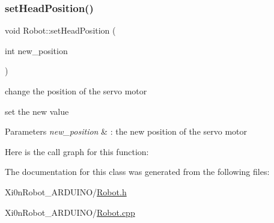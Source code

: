 \subsubsection{\texorpdfstring{set\+Head\+Position()}{setHeadPosition()}}
{\footnotesize\ttfamily void Robot\+::set\+Head\+Position (\begin{DoxyParamCaption}\item[{int}]{new\+\_\+position }\end{DoxyParamCaption})}



change the position of the servo motor 

set the new value


\begin{DoxyParams}{Parameters}
{\em new\+\_\+position} & \+: the new position of the servo motor \\
\hline
\end{DoxyParams}
Here is the call graph for this function\+:


The documentation for this class was generated from the following files\+:\begin{DoxyCompactItemize}
\item 
Xi0n\+Robot\+\_\+\+A\+R\+D\+U\+I\+N\+O/\hyperlink{_robot_8h}{Robot.\+h}\item 
Xi0n\+Robot\+\_\+\+A\+R\+D\+U\+I\+N\+O/\hyperlink{_robot_8cpp}{Robot.\+cpp}\end{DoxyCompactItemize}
